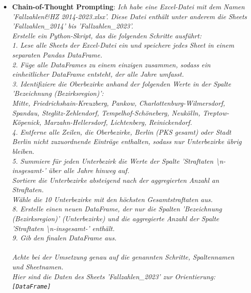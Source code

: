 \documentclass[11pt,a4paper]{article}
\begin{document}
\begin{itemize}
        \item \textbf{Chain-of-Thought Prompting}: \emph{Ich habe eine Excel-Datei mit dem Namen 'Fallzahlen\&HZ 2014-2023.xlsx'. Diese Datei enthält unter anderem die Sheets 'Fallzahlen\_2014' bis 'Fallzahlen\_2023'.\\Erstelle ein Python-Skript, das die folgenden Schritte ausführt:\\1. Lese alle Sheets der Excel-Datei ein und speichere jedes Sheet in einem separaten Pandas DataFrame.\\2. Füge alle DataFrames zu einem einzigen zusammen, sodass ein einheitlicher DataFrame entsteht, der alle Jahre umfasst.\\3. Identifiziere die Oberbezirke anhand der folgenden Werte in der Spalte 'Bezeichnung (Bezirksregion)':\\Mitte, Friedrichshain-Kreuzberg, Pankow, Charlottenburg-Wilmersdorf, Spandau, Steglitz-Zehlendorf, Tempelhof-Schöneberg, Neukölln, Treptow-Köpenick, Marzahn-Hellersdorf, Lichtenberg, Reinickendorf.\\4. Entferne alle Zeilen, die Oberbezirke, Berlin (PKS gesamt) oder Stadt Berlin nicht zuzuordnende Einträge enthalten, sodass nur Unterbezirke übrig bleiben.\\5. Summiere für jeden Unterbezirk die Werte der Spalte 'Straftaten \textbackslash n-insgesamt-' über alle Jahre hinweg auf.\\Sortiere die Unterbezirke absteigend nach der aggregierten Anzahl an Straftaten.\\Wähle die 10 Unterbezirke mit den höchsten Gesamtstraftaten aus.\\8. Erstelle einen neuen DataFrame, der nur die Spalten 'Bezeichnung (Bezirksregion)' (Unterbezirke) und die aggregierte Anzahl der Spalte 'Straftaten \textbackslash n-insgesamt-' enthält.\\9. Gib den finalen DataFrame aus.\\\\Achte bei der Umsetzung genau auf die genannten Schritte, Spaltennamen und Sheetnamen.\\Hier sind die Daten des Sheets 'Fallzahlen\_2023' zur Orientierung:\texttt{[DataFrame]}}
    \end{itemize}
\end{document}
